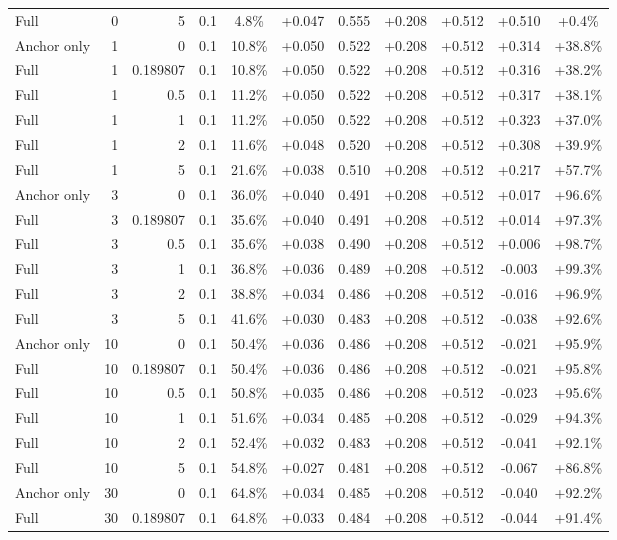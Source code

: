 \begin{table}[htbp]
\begin{tabular}{lrrrccccccc}
Full & 0 & 5 & 0.1 & 4.8\% & +0.047 & 0.555 & +0.208 & +0.512 & +0.510 & +0.4\% \\
Anchor only & 1 & 0 & 0.1 & 10.8\% & +0.050 & 0.522 & +0.208 & +0.512 & +0.314 & +38.8\% \\
Full & 1 & 0.189807 & 0.1 & 10.8\% & +0.050 & 0.522 & +0.208 & +0.512 & +0.316 & +38.2\% \\
Full & 1 & 0.5 & 0.1 & 11.2\% & +0.050 & 0.522 & +0.208 & +0.512 & +0.317 & +38.1\% \\
Full & 1 & 1 & 0.1 & 11.2\% & +0.050 & 0.522 & +0.208 & +0.512 & +0.323 & +37.0\% \\
Full & 1 & 2 & 0.1 & 11.6\% & +0.048 & 0.520 & +0.208 & +0.512 & +0.308 & +39.9\% \\
Full & 1 & 5 & 0.1 & 21.6\% & +0.038 & 0.510 & +0.208 & +0.512 & +0.217 & +57.7\% \\
Anchor only & 3 & 0 & 0.1 & 36.0\% & +0.040 & 0.491 & +0.208 & +0.512 & +0.017 & +96.6\% \\
Full & 3 & 0.189807 & 0.1 & 35.6\% & +0.040 & 0.491 & +0.208 & +0.512 & +0.014 & +97.3\% \\
Full & 3 & 0.5 & 0.1 & 35.6\% & +0.038 & 0.490 & +0.208 & +0.512 & +0.006 & +98.7\% \\
Full & 3 & 1 & 0.1 & 36.8\% & +0.036 & 0.489 & +0.208 & +0.512 & -0.003 & +99.3\% \\
Full & 3 & 2 & 0.1 & 38.8\% & +0.034 & 0.486 & +0.208 & +0.512 & -0.016 & +96.9\% \\
Full & 3 & 5 & 0.1 & 41.6\% & +0.030 & 0.483 & +0.208 & +0.512 & -0.038 & +92.6\% \\
Anchor only & 10 & 0 & 0.1 & 50.4\% & +0.036 & 0.486 & +0.208 & +0.512 & -0.021 & +95.9\% \\
Full & 10 & 0.189807 & 0.1 & 50.4\% & +0.036 & 0.486 & +0.208 & +0.512 & -0.021 & +95.8\% \\
Full & 10 & 0.5 & 0.1 & 50.8\% & +0.035 & 0.486 & +0.208 & +0.512 & -0.023 & +95.6\% \\
Full & 10 & 1 & 0.1 & 51.6\% & +0.034 & 0.485 & +0.208 & +0.512 & -0.029 & +94.3\% \\
Full & 10 & 2 & 0.1 & 52.4\% & +0.032 & 0.483 & +0.208 & +0.512 & -0.041 & +92.1\% \\
Full & 10 & 5 & 0.1 & 54.8\% & +0.027 & 0.481 & +0.208 & +0.512 & -0.067 & +86.8\% \\
Anchor only & 30 & 0 & 0.1 & 64.8\% & +0.034 & 0.485 & +0.208 & +0.512 & -0.040 & +92.2\% \\
Full & 30 & 0.189807 & 0.1 & 64.8\% & +0.033 & 0.484 & +0.208 & +0.512 & -0.044 & +91.4\% \\

\end{tabular}
\end{table}
